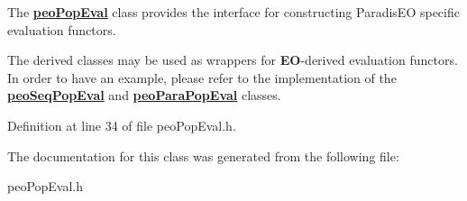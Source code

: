 The {\bf \hyperlink{classpeoPopEval}{peo\-Pop\-Eval}} class provides the interface for constructing Paradis\-EO specific evaluation functors. 

The derived classes may be used as wrappers for {\bf EO}-derived evaluation functors. In order to have an example, please refer to the implementation of the {\bf \hyperlink{classpeoSeqPopEval}{peo\-Seq\-Pop\-Eval}} and {\bf \hyperlink{classpeoParaPopEval}{peo\-Para\-Pop\-Eval}} classes. 



Definition at line 34 of file peo\-Pop\-Eval.h.

The documentation for this class was generated from the following file:\begin{CompactItemize}
\item 
peo\-Pop\-Eval.h\end{CompactItemize}

